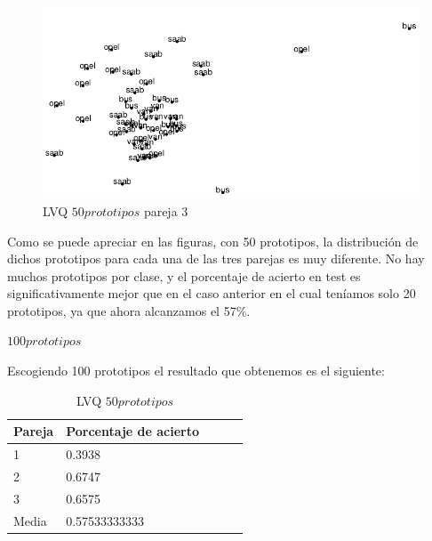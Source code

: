 \documentclass[11pt,spanish,listoffigures,listoftables]{workluis}
\begin{document}
\begin{figure}[H]
\centering
\includegraphics[scale=0.5]{lvq50p3}
\caption{LVQ $50 prototipos$ pareja 3}
\end{figure} 

\par Como se puede apreciar en las figuras, con 50 prototipos, la distribución de dichos prototipos para cada una de las tres parejas es muy diferente. No hay muchos prototipos por clase, y el porcentaje de acierto en test es significativamente mejor que en el caso anterior en el cual teníamos solo 20 prototipos, ya que ahora alcanzamos el 57\%.


\par \textbf{$100 prototipos$}

\par Escogiendo 100 prototipos el resultado que obtenemos es el siguiente:

\begin{table}[H]
\centering
\caption{LVQ $50 prototipos$}
\label{tb:tb22}
\begin{tabular}{lllll}
\hline
\multicolumn{1}{|l|}{Pareja} & Porcentaje de acierto \\ \hline \hline
1                            & 0.3938			     \\
2                            & 0.6747			     \\
3                            & 0.6575			     \\
Media                        & 0.57533333333         \\ \hline
\end{tabular}
\end{table}
\end{document}

